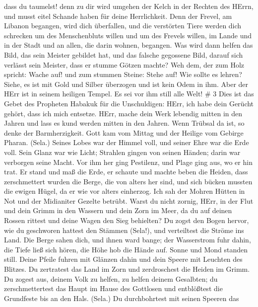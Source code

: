 dass du taumelst! denn zu dir wird umgehen der Kelch in der Rechten des
HErrn, und musst eitel Schande haben für deine Herrlichkeit.
 Denn der Frevel, am Libanon begangen, wird dich
überfallen, und die verstörten Tiere werden dich schrecken um des
Menschenbluts willen und um des Frevels willen, im Lande und in der
Stadt und an allen, die darin wohnen, begangen.  Was wird
dann helfen das Bild, das sein Meister gebildet hat, und das falsche
gegossene Bild, darauf sich verlässt sein Meister, dass er stumme Götzen
machte?  Weh dem, der zum Holz spricht: Wache auf! und zum
stummen Steine: Stehe auf! Wie sollte es lehren? Siehe, es ist mit Gold
und Silber überzogen und ist kein Odem in ihm.  Aber der
HErr ist in seinem heiligen Tempel. Es sei vor ihm still alle Welt! \# 3
 Dies ist das Gebet des Propheten Habakuk für die
Unschuldigen:  HErr, ich habe dein Gerücht gehört, dass ich
mich entsetze. HErr, mache dein Werk lebendig mitten in den Jahren und
lass es kund werden mitten in den Jahren. Wenn Trübsal da ist, so denke
der Barmherzigkeit.  Gott kam vom Mittag und der Heilige vom
Gebirge Pharan. (Sela.) Seines Lobes war der Himmel voll, und seiner
Ehre war die Erde voll.  Sein Glanz war wie Licht; Strahlen
gingen von seinen Händen; darin war verborgen seine Macht. 
Vor ihm her ging Pestilenz, und Plage ging aus, wo er hin trat.
 Er stand und maß die Erde, er schaute und machte beben die
Heiden, dass zerschmettert wurden die Berge, die von alters her sind,
und sich bücken mussten die ewigen Hügel, da er wie vor alters
einherzog.  Ich sah der Mohren Hütten in Not und der
Midianiter Gezelte betrübt.  Warst du nicht zornig, HErr, in
der Flut und dein Grimm in den Wassern und dein Zorn im Meer, da du auf
deinen Rossen rittest und deine Wagen den Sieg behielten? 
Du zogst den Bogen hervor, wie du geschworen hattest den Stämmen
(Sela!), und verteiltest die Ströme ins Land.  Die Berge
sahen dich, und ihnen ward bange; der Wasserstrom fuhr dahin, die Tiefe
ließ sich hören, die Höhe hob die Hände auf.  Sonne und
Mond standen still. Deine Pfeile fuhren mit Glänzen dahin und dein
Speere mit Leuchten des Blitzes.  Du zertratest das Land im
Zorn und zerdroschest die Heiden im Grimm.  Du zogest aus,
deinem Volk zu helfen, zu helfen deinem Gesalbten; du zerschmettertest
das Haupt im Hause des Gottlosen und entblößtest die Grundfeste bis an
den Hals. (Sela.)  Du durchbohrtest mit seinen Speeren das
